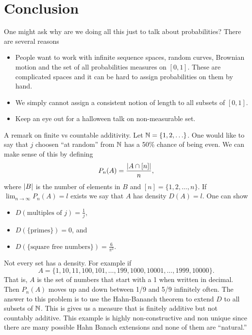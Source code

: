 \section{Conclusion}
One might ask why are we doing all this just to talk about probabilities? There are several reasons
\begin{itemize}
    \item People want to work with infinite sequence spaces, random curves, Brownian motion and the set of all probabilities measures on $[0,1]$. These are complicated spaces and it can be hard to assign probabilities on them by hand.
    \item We simply cannot assign a consistent notion of length to all subsets of $[0,1]$.
    \item Keep an eye out for a halloween talk on non-measurable set.
\end{itemize} 
A remark on finite vs countable additivity. Let ${{\mathbb N}} = \{1,2,\ldots\}$. One would like to say that $j$ choosen ``at random'' from ${{\mathbb N}}$ has a 50\% chance of being even. We can make sense of this by defining
\[P_n(A) = \frac{{\left\lvert A \cap [n]\right\rvert}}{n}, \]
where ${\left\lvert B\right\rvert}$ is the number of elements in $B$ and $[n] = \{1,2,\ldots,n\}$. If $\lim_{n \to \infty}P_n(A)=l$ exists we say that $A$ has density $D(A) = l$. One can show
\begin{itemize}
    \item $D(\text{multiples of } j) = \frac{1}{j}$,
    \item $D(\{\text{primes}\}) = 0$, and
    \item $D(\{\text{square free numbers}\}) = \frac{6}{\pi^2}$.
\end{itemize} 
Not every set has a density. For example if 
\[A = \{1,10,11,100,101,\ldots,199,1000,10001,\ldots,1999,10000\}. \]
That is, $A$ is the set of numbers that start with a 1 when written in decimal. Then $P_n(A)$ moves up and down between 1/9 and 5/9 infinitely often. The answer to this problem is to use the Hahn-Bananch theorem to extend $D$ to all subsets of ${{\mathbb N}}$. This is gives us a measure that is finitely additive but not countably additive. This example is highly non-constructive and non unique since there are many possible Hahn Banach extensions and none of them are ``natural.''
